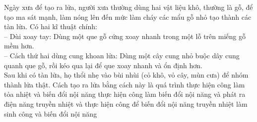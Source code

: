 	\begin{ex}%
		Ngày xưa để tạo ra lửa, người xưa thường dùng hai vật liệu khô, thường là gỗ, để tạo ma sát mạnh, làm nóng lên đến mức làm cháy các mẩu gỗ nhỏ tạo thành các tàn lửa. Có hai kĩ thuật chính:\\
		-- Dùi xoay tay: Dùng một que gỗ cứng xoay nhanh trong một lỗ trên miếng gỗ mềm hơn.\\
		-- Cách thứ hai dùng cung khoan lửa: Dùng một cây cung nhỏ buộc dây cung quanh que gỗ, rồi kéo qua lại để que xoay nhanh và ổn định hơn.\\
		Sau khi có tàn lửa, họ thổi nhẹ vào bùi nhùi (cỏ khô, vỏ cây, mùn cưa) để nhóm thành lửa thật. Cách tạo ra lửa bằng cách này là quá trình
		\choice
		{\True thực hiện công làm tỏa nhiệt và biến đổi nội năng}
		{thực hiện công làm biến đổi nội năng và phát ra điện năng}
		{truyền nhiệt và thực hiện công để biến đổi nội năng}
		{truyền nhiệt làm sinh công và biến đổi nội năng}
	\end{ex}

